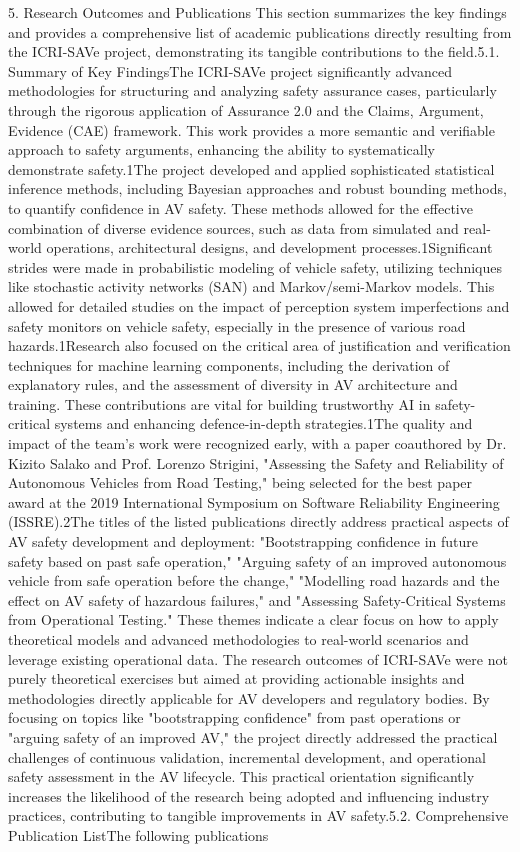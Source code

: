 5. Research Outcomes and Publications This section summarizes the key findings and provides a comprehensive list of academic publications directly resulting from the ICRI-SAVe project, demonstrating its tangible contributions to the field.5.1. Summary of Key FindingsThe ICRI-SAVe project significantly advanced methodologies for structuring and analyzing safety assurance cases, particularly through the rigorous application of Assurance 2.0 and the Claims, Argument, Evidence (CAE) framework. This work provides a more semantic and verifiable approach to safety arguments, enhancing the ability to systematically demonstrate safety.1The project developed and applied sophisticated statistical inference methods, including Bayesian approaches and robust bounding methods, to quantify confidence in AV safety. These methods allowed for the effective combination of diverse evidence sources, such as data from simulated and real-world operations, architectural designs, and development processes.1Significant strides were made in probabilistic modeling of vehicle safety, utilizing techniques like stochastic activity networks (SAN) and Markov/semi-Markov models. This allowed for detailed studies on the impact of perception system imperfections and safety monitors on vehicle safety, especially in the presence of various road hazards.1Research also focused on the critical area of justification and verification techniques for machine learning components, including the derivation of explanatory rules, and the assessment of diversity in AV architecture and training. These contributions are vital for building trustworthy AI in safety-critical systems and enhancing defence-in-depth strategies.1The quality and impact of the team's work were recognized early, with a paper coauthored by Dr. Kizito Salako and Prof. Lorenzo Strigini, "Assessing the Safety and Reliability of Autonomous Vehicles from Road Testing," being selected for the best paper award at the 2019 International Symposium on Software Reliability Engineering (ISSRE).2The titles of the listed publications directly address practical aspects of AV safety development and deployment: "Bootstrapping confidence in future safety based on past safe operation," "Arguing safety of an improved autonomous vehicle from safe operation before the change," "Modelling road hazards and the effect on AV safety of hazardous failures," and "Assessing Safety-Critical Systems from Operational Testing." These themes indicate a clear focus on how to apply theoretical models and advanced methodologies to real-world scenarios and leverage existing operational data. The research outcomes of ICRI-SAVe were not purely theoretical exercises but aimed at providing actionable insights and methodologies directly applicable for AV developers and regulatory bodies. By focusing on topics like "bootstrapping confidence" from past operations or "arguing safety of an improved AV," the project directly addressed the practical challenges of continuous validation, incremental development, and operational safety assessment in the AV lifecycle. This practical orientation significantly increases the likelihood of the research being adopted and influencing industry practices, contributing to tangible improvements in AV safety.5.2. Comprehensive Publication ListThe following publications 